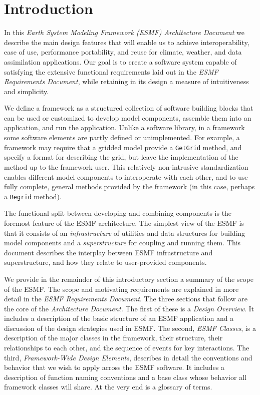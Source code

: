 \section{Introduction}

In this {\it Earth System Modeling Framework (ESMF) Architecture Document} we describe 
the main design features that will enable us to achieve interoperability, ease of 
use, performance portability, and reuse for climate, weather, and data assimilation
applications.  Our goal is to create a software system capable of satisfying
the extensive functional requirements laid out in the {\it ESMF 
Requirements Document}, while retaining in its design a measure of intuitiveness
and simplicity. 

We define a framework as a structured collection of software building blocks 
that can be used or customized to develop model components, assemble them into an 
application, and run the application.  Unlike a software library, in a framework some
software elements are partly defined or unimplemented.  For example, a framework
may require that a gridded model provide a {\tt GetGrid} method, and specify 
a format for describing the grid, but leave the implementation of the method up
to the framework user.  This relatively non-intrusive standardization enables 
different model components to interoperate with each other, and to use fully
complete, general methods provided by the framework (in this case, perhaps a 
{\tt Regrid} method).

The functional split between developing and combining components is the
foremost feature of the ESMF architecture.  The simplest view of the ESMF 
is that it consists of an {\it infrastructure} of utilities and data 
structures for building model components and a {\it superstructure} for coupling 
and running them.  This document describes the interplay between ESMF 
infrastructure and superstructure, and how they relate to user-provided components.

We provide in the remainder of this introductory section a summary of the 
scope of the ESMF.  The scope and motivating requirements are explained in more detail in the {\it ESMF Requirements Document}.  The three sections that follow are the core of the {\it Architecture Document.} The first of these is 
a {\it Design Overview}.  It includes 
a description of the basic structure of an ESMF application and a discussion of 
the design strategies
used in ESMF.  The second, {\it ESMF Classes}, is  a description of the 
major classes in the framework, their structure, their relationships to each other, 
and the sequence of events for key interactions.  The third, {\it 
Framework-Wide Design Elements}, describes in detail the conventions and behavior
that we wish to apply across the ESMF software.  It
includes a description of function naming conventions and a base class whose behavior all 
framework classes will share.  At the very end is a glossary of terms.








